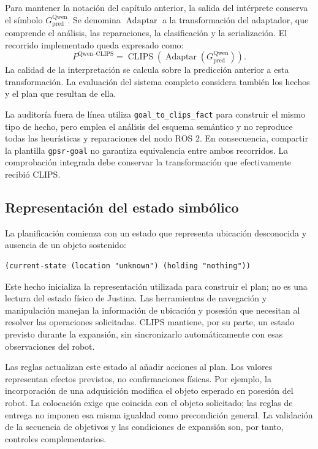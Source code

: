 Para mantener la notación del capítulo anterior, la salida del intérprete
conserva el símbolo \(G_{\mathrm{pred}}^{\mathrm{Qwen}}\). Se denomina
\(\operatorname{Adaptar}\) a la transformación del adaptador, que comprende el
análisis, las reparaciones, la clasificación y la serialización. El
recorrido implementado queda expresado como:
\begin{equation}
P^{\text{Qwen--CLIPS}} =
\operatorname{CLIPS}\!\left(
\operatorname{Adaptar}\!\left(G_{\mathrm{pred}}^{\mathrm{Qwen}}\right)\right).
\label{eq:recorrido_adaptador_impl}
\end{equation}
La calidad de la interpretación se calcula sobre la predicción anterior
a esta transformación. La evaluación del sistema completo considera
también los hechos y el plan que resultan de ella.

La auditoría fuera de línea utiliza
\texttt{goal\_\allowbreak to\_\allowbreak clips\_\allowbreak fact} para construir el mismo tipo de hecho,
pero emplea el análisis del esquema semántico y no reproduce todas las
heurísticas y reparaciones del nodo ROS 2. En consecuencia, compartir
la plantilla \texttt{gpsr-goal} no garantiza equivalencia entre ambos
recorridos. La comprobación integrada debe conservar la transformación
que efectivamente recibió CLIPS.

\subsection{Representación del estado simbólico}
\label{subsec:estado_simbolico_impl}

La planificación comienza con un estado que representa ubicación
desconocida y ausencia de un objeto sostenido:

\begin{verbatim}
(current-state (location "unknown") (holding "nothing"))
\end{verbatim}

Este hecho inicializa la representación utilizada para construir el
plan; no es una lectura del estado físico de Justina. Las herramientas
de navegación y manipulación manejan la información de ubicación y
posesión que necesitan al resolver las operaciones solicitadas.
CLIPS mantiene, por su parte, un estado previsto durante la expansión,
sin sincronizarlo automáticamente con esas observaciones del robot.

Las reglas actualizan este estado al añadir acciones al plan. Los
valores representan efectos previstos, no confirmaciones físicas. Por
ejemplo, la incorporación de una adquisición modifica el objeto
esperado en posesión del robot. La colocación exige que coincida con
el objeto solicitado; las reglas de entrega no imponen esa misma
igualdad como precondición general. La validación de la secuencia de
objetivos y las condiciones de expansión son, por tanto, controles
complementarios.

